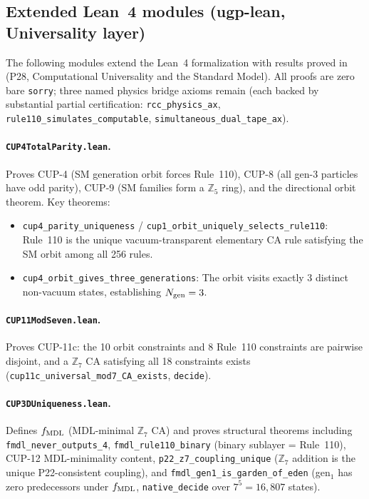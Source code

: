 \documentclass[11pt]{article}
\begin{document}
\subsection*{Extended Lean~4 modules (ugp-lean, Universality layer)}

The following modules extend the Lean~4 formalization with results proved in~\cite{SpivackCompUniversality} (P28, Computational Universality and the Standard Model). All proofs are zero bare \texttt{sorry}; three named physics bridge axioms remain (each backed by substantial partial certification: \texttt{rcc\_physics\_ax}, \texttt{rule110\_simulates\_computable}, \texttt{simultaneous\_dual\_tape\_ax}).

\paragraph{\texttt{CUP4TotalParity.lean}.}
Proves CUP-4 (SM generation orbit forces Rule~110), CUP-8 (all gen-3 particles have odd parity), CUP-9 (SM families form a $\mathbb{Z}_5$ ring), and the directional orbit theorem. Key theorems:
\begin{itemize}
\item \texttt{cup4\_parity\_uniqueness} / \texttt{cup1\_orbit\_uniquely\_selects\_rule110}: Rule~110 is the unique vacuum-transparent elementary CA rule satisfying the SM orbit among all 256 rules.
\item \texttt{cup4\_orbit\_gives\_three\_generations}: The orbit visits exactly 3 distinct non-vacuum states, establishing $N_{\rm gen}=3$.
\end{itemize}

\paragraph{\texttt{CUP11ModSeven.lean}.}
Proves CUP-11c: the 10 orbit constraints and 8 Rule~110 constraints are pairwise disjoint,
and a $\mathbb{Z}_7$ CA satisfying all 18 constraints exists
(\texttt{cup11c\_uni\-ver\-sal\_mod7\_CA\_exists}, \texttt{decide}).

\paragraph{\texttt{CUP3DUniqueness.lean}.}
Defines $f_{\rm MDL}$ (MDL-minimal $\mathbb{Z}_7$ CA) and proves structural theorems including \texttt{fmdl\_never\_outputs\_4}, \texttt{fmdl\_rule110\_binary} (binary sublayer = Rule~110), CUP-12 MDL-minimality content, \texttt{p22\_z7\_coupling\_unique} ($\mathbb{Z}_7$ addition is the unique P22-consistent coupling), and \texttt{fmdl\_gen1\_is\_garden\_of\_eden} (gen$_1$ has zero predecessors under $f_{\rm MDL}$, \texttt{native\_decide} over $7^5=16{,}807$ states).
\end{document}
